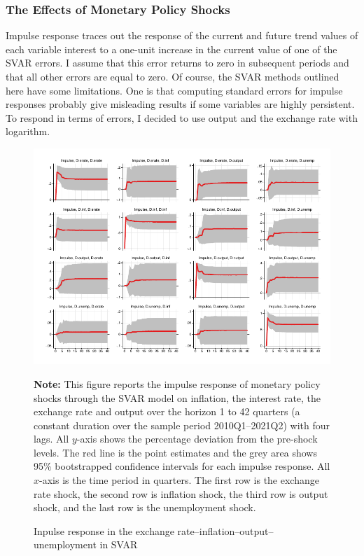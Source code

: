 \documentclass[11pt,letterpaper]{article}
\begin{document}
\subsubsection{The Effects of Monetary Policy Shocks}
Impulse response traces out the response of the current and future trend values of each variable interest to a one-unit increase in the current value of one of the SVAR errors. I assume that this error returns to zero in subsequent periods and that all other errors are equal to zero. Of course, the SVAR methods outlined here have some limitations. One is that computing standard errors for impulse responses probably give misleading results if some variables are highly persistent. To respond in terms of errors, I decided to use output and the exchange rate with logarithm.  

\begin{figure}[H]
	\centering
	\caption{Inpulse response in the exchange rate--inflation--output--unemployment in SVAR}
	\label{fig:4}
	\includegraphics[width=1\linewidth]{../../empirical/Marcodata/Graphs/var_svar1}
	
	\begin{tablenotes}
		\footnotesize
		\item \textbf{Note:} This figure reports the impulse response of monetary policy shocks through the SVAR model on inflation, the interest rate, the exchange rate and output over the horizon 1 to 42 quarters (a constant duration over the sample period 2010Q1–2021Q2) with four lags. All $y$-axis shows the percentage deviation from the pre-shock levels. The red line is the point estimates and the grey area shows 95\% bootstrapped confidence intervals for each impulse response. All $x$-axis is the time period in quarters. The first row is the exchange rate shock, the second row is inflation shock, the third row is output shock, and the last row is the unemployment shock. 
		
	\end{tablenotes} 
\end{figure}
\end{document}

